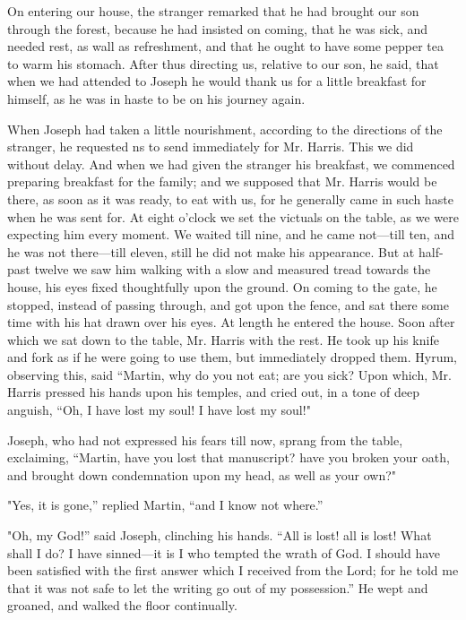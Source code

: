 		On entering our house, the stranger remarked that he had brought our son through the forest, because he had insisted on coming, that he was sick, and needed rest, as wall as refreshment, and that he ought to have some pepper tea to warm his stomach. After thus directing us, relative to our son, he said, that when we had attended to Joseph he would thank us for a little breakfast for himself, as he was in haste to be on his journey again.

		When Joseph had taken a little nourishment, according to the directions of the stranger, he requested ns to send immediately for Mr. Harris. This we did without delay. And when we had given the stranger his breakfast, we commenced preparing breakfast for the family; and we supposed that Mr. Harris would be there, as soon as it was ready, to eat with us, for he generally came in such haste when he was sent for. At eight o'clock we set the victuals on the table, as we were expecting him every moment. We waited till nine, and he came not---till ten, and he was not there---till eleven, still he did not make his appearance. But at half-past twelve we saw him walking with a slow and measured tread towards the house, his eyes fixed thoughtfully upon the ground. On coming to the gate, he stopped, instead of passing through, and got upon the fence, and sat there some time with his hat drawn over his eyes. At length he entered the house. Soon after which we sat down to the table, Mr. Harris with the rest. He took up his knife and fork as if he were going to use them, but immediately dropped them. Hyrum, observing this, said ``Martin, why do you not eat; are you sick? Upon which, Mr. Harris pressed his hands upon his temples, and cried out, in a tone of deep anguish, ``Oh, I have lost my soul! I have lost my soul!"

		Joseph, who had not expressed his fears till now, sprang from the table, exclaiming, ``Martin, have you lost that manuscript? have you broken your oath, and brought down condemnation upon my head, as well as your own?"

		"Yes, it is gone,'' replied Martin, ``and I know not where.''

		"Oh, my God!'' said Joseph, clinching his hands. ``All is lost! all is lost! What shall I do? I have sinned---it is I who tempted the wrath of God. I should have been satisfied with the first answer which I received from the Lord; for he told me that it was not safe to let the writing go out of my possession.'' He wept and groaned, and walked the floor continually.

